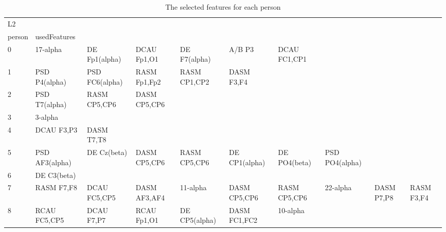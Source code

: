 \begin{landscape}
\begin{table}[]
\centering
\caption{The selected features for each person}
\begin{tabular}{l|llllllll}
L2       &                &                &                &                &                &                &                &                &               &              \\
person   & usedFeatures   &                &                &                &                &                &                &                &               &              \\
0        & 17-alpha       & DE Fp1(alpha)  & DCAU Fp1,O1    & DE F7(alpha)   & A/B P3         & DCAU FC1,CP1   &                &                &               &              \\
1        & PSD P4(alpha)  & PSD FC6(alpha) & RASM Fp1,Fp2   & RASM CP1,CP2   & DASM F3,F4     &                &                &                &               &              \\
2        & PSD T7(alpha)  & RASM CP5,CP6   & DASM CP5,CP6   &                &                &                &                &                &               &              \\
3        & 3-alpha        &                &                &                &                &                &                &                &               &              \\
4        & DCAU F3,P3     & DASM T7,T8     &                &                &                &                &                &                &               &              \\
5        & PSD AF3(alpha) & DE Cz(beta)    & DASM CP5,CP6   & RASM CP5,CP6   & DE CP1(alpha)  & DE PO4(beta)   & PSD PO4(alpha) &                &               &              \\
6        & DE C3(beta)    &                &                &                &                &                &                &                &               &              \\
7        & RASM F7,F8     & DCAU FC5,CP5   & DASM AF3,AF4   & 11-alpha       & DASM CP5,CP6   & RASM CP5,CP6   & 22-alpha       & DASM P7,P8     & RASM F3,F4    &              \\
8        & RCAU FC5,CP5   & DCAU F7,P7     & RCAU Fp1,O1    & DE CP5(alpha)  & DASM FC1,FC2   & 10-alpha       &                &                &               &              \\

\end{tabular}
\end{table}
\end{landscape}
